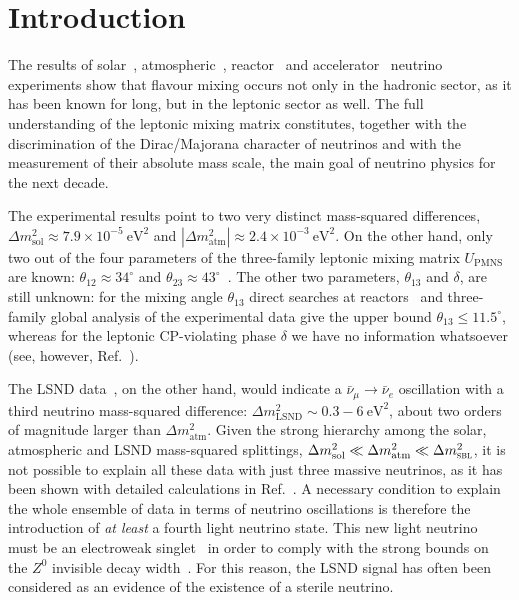 \documentclass[12pt]{elsart}
\newcommand{\eVq}{\ensuremath{\text{eV}^2}}
\newcommand{\Dmq}{\Delta m^2}
\newcommand{\Sol}{\text{sol}}
\newcommand{\Atm}{\text{atm}}
\newcommand{\Sbl}{\textsc{sbl}}
\begin{document}
\section{Introduction}

The results of solar~\cite{Cleveland:1998nv, Abdurashitov:1999zd,
Hampel:1998xg, Fukuda:2001nj, Ahmad:2001an, Ahmed:2003kj},
atmospheric~\cite{Fukuda:1998mi, Ambrosio:2001je},
reactor~\cite{Apollonio:1999ae, Apollonio:2002gd, Boehm:2001ik,
Eguchi:2002dm} and accelerator~\cite{Ahn:2002up, Aliu:2004sq,
Michael:2006rx} neutrino experiments show that flavour mixing occurs
not only in the hadronic sector, as it has been known for long, but in
the leptonic sector as well.  The full understanding of the leptonic
mixing matrix constitutes, together with the discrimination of the
Dirac/Majorana character of neutrinos and with the measurement of
their absolute mass scale, the main goal of neutrino physics for the
next decade. 

The experimental results point to two very distinct mass-squared
differences, $\Dmq_\Sol \approx 7.9 \times 10^{-5}~\eVq$ and
$|\Dmq_\Atm| \approx 2.4 \times 10^{-3}~\eVq$. On the other hand, only
two out of the four parameters of the three-family leptonic mixing
matrix $U_\text{PMNS}$~\cite{Pontecorvo:1957cp, Maki:1962mu,
Pontecorvo:1967fh, Gribov:1968kq} are known: $\theta_{12} \approx
34^\circ$ and $\theta_{23} \approx
43^\circ$~\cite{GonzalezGarcia:2007ib}.  The other two parameters,
$\theta_{13}$ and $\delta$, are still unknown: for the mixing angle
$\theta_{13}$ direct searches at reactors~\cite{Apollonio:1999ae,
Apollonio:2002gd, Boehm:2001ik} and three-family global analysis of
the experimental data give the upper bound $\theta_{13} \leq
11.5^\circ$, whereas for the leptonic CP-violating phase $\delta$ we
have no information whatsoever (see, however,
Ref.~\cite{GonzalezGarcia:2007ib}).

The LSND data~\cite{Athanassopoulos:1996wc, Athanassopoulos:1997pv,
Aguilar:2001ty}, on the other hand, would indicate a $\bar \nu_\mu \to
\bar \nu_e$ oscillation with a third neutrino mass-squared difference:
$\Dmq_\text{LSND} \sim 0.3 - 6~\eVq$, about two orders of magnitude
larger than $\Dmq_\Atm$. Given the strong hierarchy among the solar,
atmospheric and LSND mass-squared splittings, $\Dmq_\Sol \ll \Dmq_\Atm
\ll \Dmq_\Sbl$, it is not possible to explain all these data with just
three massive neutrinos, as it has been shown with detailed
calculations in Ref.~\cite{Fogli:1999zq}. A necessary condition to
explain the whole ensemble of data in terms of neutrino oscillations
is therefore the introduction of \emph{at least} a fourth light
neutrino state.  This new light neutrino must be an electroweak
singlet~\cite{Pontecorvo:1967fh} in order to comply with the strong
bounds on the $Z^0$ invisible decay width~\cite{Yao:2006px, LEPfinal}.
For this reason, the LSND signal has often been considered as an
evidence of the existence of a sterile neutrino.
\end{document}
